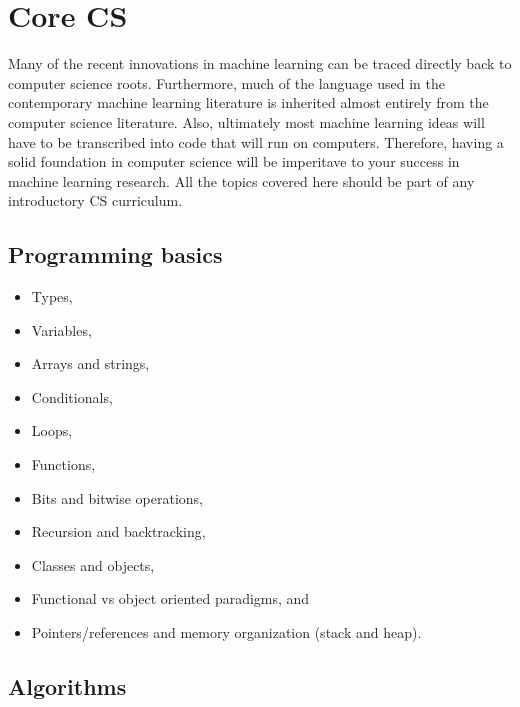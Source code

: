 \hypertarget{core-cs}{%
\section{Core CS}\label{core-cs}}

Many of the recent innovations in machine learning can be traced
directly back to computer science roots. Furthermore, much of the
language used in the contemporary machine learning literature is
inherited almost entirely from the computer science literature. Also,
ultimately most machine learning ideas will have to be transcribed into
code that will run on computers. Therefore, having a solid foundation in
computer science will be imperitave to your success in machine learning
research. All the topics covered here should be part of any introductory
CS curriculum.

\hypertarget{programming-basics}{%
\subsection{Programming basics}\label{programming-basics}}

\begin{itemize}
\tightlist
\item
  Types,
\item
  Variables,
\item
  Arrays and strings,
\item
  Conditionals,
\item
  Loops,
\item
  Functions,
\item
  Bits and bitwise operations,
\item
  Recursion and backtracking,
\item
  Classes and objects,
\item
  Functional vs object oriented paradigms, and
\item
  Pointers/references and memory organization (stack and heap).
\end{itemize}

\hypertarget{algorithms}{%
\subsection{Algorithms}\label{algorithms}}

